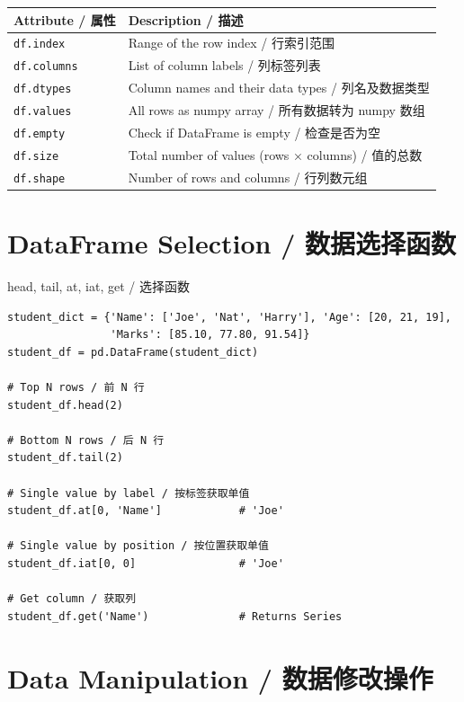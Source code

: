 \documentclass[11pt,a4paper]{report}
\let\oldtexttt\texttt
\renewcommand{\texttt}[1]{\textcolor{mainblue}{\oldtexttt{#1}}}
\begin{document}
\medskip
\centering
\renewcommand{\arraystretch}{1.3}
\begin{tabular}{@{}ll@{}}
\toprule
\textbf{Attribute / 属性} & \textbf{Description / 描述} \\ \midrule
\texttt{df.index}   & Range of the row index / 行索引范围 \\
\texttt{df.columns} & List of column labels / 列标签列表 \\
\texttt{df.dtypes}  & Column names and their data types / 列名及数据类型 \\
\texttt{df.values}  & All rows as numpy array / 所有数据转为 numpy 数组 \\
\texttt{df.empty}   & Check if DataFrame is empty / 检查是否为空 \\
\texttt{df.size}    & Total number of values (rows × columns) / 值的总数 \\
\texttt{df.shape}   & Number of rows and columns / 行列数元组 \\ \bottomrule
\end{tabular}
\medskip

\section{DataFrame Selection / 数据选择函数}

\begin{examplebox}{head, tail, at, iat, get / 选择函数}
\begin{lstlisting}
student_dict = {'Name': ['Joe', 'Nat', 'Harry'], 'Age': [20, 21, 19],
                'Marks': [85.10, 77.80, 91.54]}
student_df = pd.DataFrame(student_dict)

# Top N rows / 前 N 行
student_df.head(2)

# Bottom N rows / 后 N 行
student_df.tail(2)

# Single value by label / 按标签获取单值
student_df.at[0, 'Name']            # 'Joe'

# Single value by position / 按位置获取单值
student_df.iat[0, 0]                # 'Joe'

# Get column / 获取列
student_df.get('Name')              # Returns Series
\end{lstlisting}
\end{examplebox}

\section{Data Manipulation / 数据修改操作}
\end{document}
